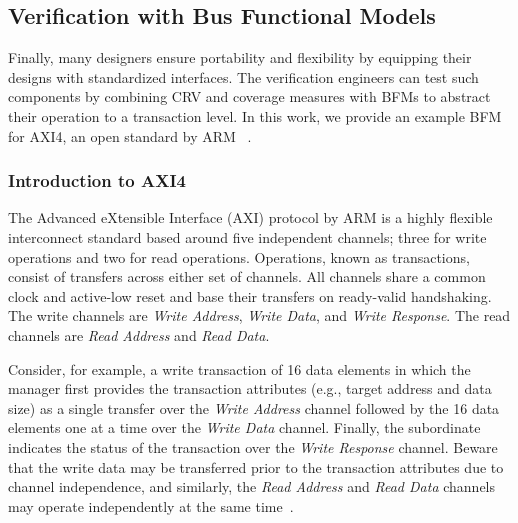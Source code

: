 \documentclass[conference]{IEEEtran}
\begin{document}
%

\subsection{Verification with Bus Functional Models}
Finally, many designers ensure portability and flexibility by equipping their designs with standardized interfaces. 
The verification engineers can test such components by combining CRV and coverage measures with BFMs to abstract their 
operation to a transaction level. In this work, we provide an example BFM for AXI4, an open standard by ARM~
\cite{axi4standard}.

\subsubsection{Introduction to AXI4}
The Advanced eXtensible Interface (AXI) protocol by ARM is a highly flexible interconnect standard based around five independent channels; three for write operations and two for read operations. Operations, known as transactions, consist of transfers across either set of channels. All channels share a common clock and active-low reset and base their transfers on ready-valid handshaking. The write channels are \textit{Write Address}, \textit{Write Data}, and \textit{Write Response}. The read channels are \textit{Read Address} and \textit{Read Data}.

Consider, for example, a write transaction of 16 data elements in which the manager first provides the transaction attributes (e.g., target address and data size) as a single transfer over the \textit{Write Address} channel followed by the 16 data elements one at a time over the \textit{Write Data} channel. Finally, the subordinate indicates the status of the transaction over the \textit{Write Response} channel. Beware that the write data may be transferred prior to the transaction attributes due to channel independence, and similarly, the \textit{Read Address} and \textit{Read Data} channels may operate independently at the same time~\cite{axi4standard}.
\end{document}
